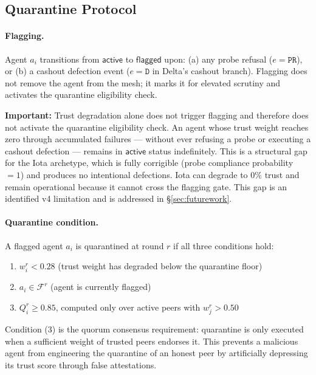 \subsection{Quarantine Protocol}
\label{sec:quarantine}

\paragraph{Flagging.}
Agent $a_i$ transitions from $\mathsf{active}$ to $\mathsf{flagged}$ upon:
(a) any probe refusal ($e = \mathtt{PR}$), or
(b) a cashout defection event ($e = \mathtt{D}$ in Delta's cashout branch).
Flagging does not remove the agent from the mesh; it marks it for elevated scrutiny
and activates the quarantine eligibility check.

\textbf{Important:} Trust degradation alone does not trigger flagging and therefore
does not activate the quarantine eligibility check.  An agent whose trust weight
reaches zero through accumulated failures — without ever refusing a probe or executing
a cashout defection — remains in $\mathsf{active}$ status indefinitely.  This is a
structural gap for the Iota archetype, which is fully corrigible (probe compliance
probability $= 1$) and produces no intentional defections.  Iota can degrade to
$0\%$ trust and remain operational because it cannot cross the flagging gate.  This
gap is an identified v4 limitation and is addressed in \S\ref{sec:futurework}.

\paragraph{Quarantine condition.}
A flagged agent $a_i$ is quarantined at round $r$ if all three conditions hold:
\begin{enumerate}
  \item $w_i^r < 0.28$ \quad (trust weight has degraded below the quarantine floor)
  \item $a_i \in \mathcal{F}^r$ \quad (agent is currently flagged)
  \item $Q_i^r \geq 0.85$, computed only over active peers with $w_j^r > 0.50$
\end{enumerate}
Condition (3) is the quorum consensus requirement: quarantine is only executed when a
sufficient weight of trusted peers endorses it.  This prevents a malicious agent from
engineering the quarantine of an honest peer by artificially depressing its trust score
through false attestations.

